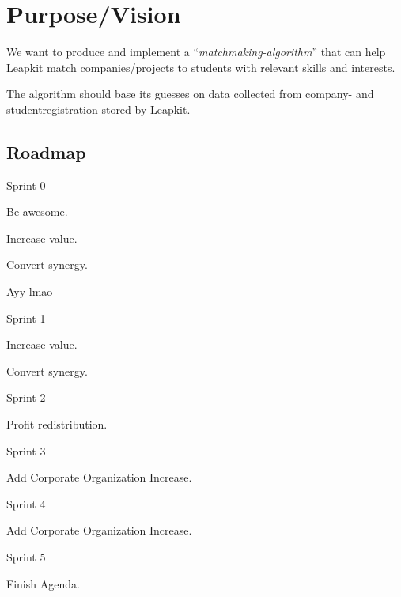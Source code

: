 \section{Purpose/Vision}

We want to produce and implement a ``\emph{matchmaking-algorithm}''
that can help Leapkit match companies/projects to students with relevant
skills and interests.

The algorithm should base its guesses on data collected from company-
and studentregistration stored by Leapkit.

\subsection{Roadmap}
\begin{itemize*}
  \item Sprint 0
        \begin{enumerate*}
          \item Be awesome.
          \item Increase value.
          \item Convert synergy.
          \item Ayy lmao
        \end{enumerate*}
  \item Sprint 1
        \begin{enumerate*}
          \item Increase value.
          \item Convert synergy.
        \end{enumerate*}
  \item Sprint 2
        \begin{enumerate*}
          \item Profit redistribution.
        \end{enumerate*}
  \item Sprint 3
        \begin{enumerate*}
          \item Add Corporate Organization Increase.
        \end{enumerate*}
  \item Sprint 4
        \begin{enumerate*}
          \item Add Corporate Organization Increase.
        \end{enumerate*}
  \item Sprint 5
        \begin{enumerate*}
          \item Finish Agenda.
        \end{enumerate*}
\end{itemize*}
